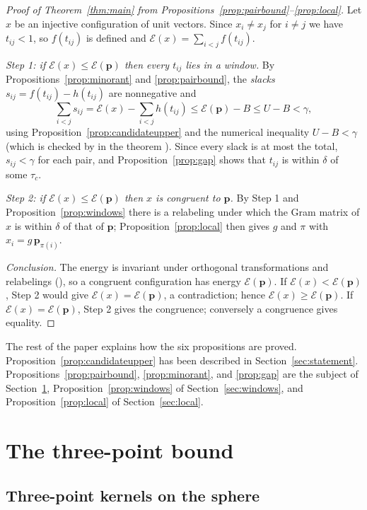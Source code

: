 \documentclass[11pt]{amsart}
\theoremstyle{definition}
\theoremstyle{remark}
\newcommand{\E}{\mathcal{E}}
\newcommand{\cand}{\mathbf{p}}
\begin{document}
\begin{proof}[Proof of Theorem~\ref{thm:main} from Propositions~\ref{prop:pairbound}--\ref{prop:local}]
Let $x$ be an injective configuration of unit vectors. Since $x_i\ne x_j$ for $i\ne j$ we have $t_{ij}<1$, so $f(t_{ij})$ is defined and $\E(x)=\sum_{i<j}f(t_{ij})$.

\emph{Step 1: if $\E(x)\le\E(\cand)$ then every $t_{ij}$ lies in a window.} By Propositions~\ref{prop:minorant} and \ref{prop:pairbound}, the \emph{slacks} $s_{ij}=f(t_{ij})-h(t_{ij})$ are nonnegative and
\[
  \sum_{i<j}s_{ij}=\E(x)-\sum_{i<j}h(t_{ij})\le \E(\cand)-B\le U-B<\gamma ,
\]
using Proposition~\ref{prop:candidateupper} and the numerical inequality $U-B<\gamma$ (which is checked by  in the theorem ). Since every slack is at most the total, $s_{ij}<\gamma$ for each pair, and Proposition~\ref{prop:gap} shows that $t_{ij}$ is within $\delta$ of some $\tau_c$.

\emph{Step 2: if $\E(x)\le\E(\cand)$ then $x$ is congruent to $\cand$.} By Step 1 and Proposition~\ref{prop:windows} there is a relabeling under which the Gram matrix of $x$ is within $\delta$ of that of $\cand$; Proposition~\ref{prop:local} then gives $g$ and $\pi$ with $x_i=g\,\cand_{\pi(i)}$.

\emph{Conclusion.} The energy is invariant under orthogonal transformations and relabelings (), so a congruent configuration has energy $\E(\cand)$. If $\E(x)<\E(\cand)$, Step 2 would give $\E(x)=\E(\cand)$, a contradiction; hence $\E(x)\ge\E(\cand)$. If $\E(x)=\E(\cand)$, Step 2 gives the congruence; conversely a congruence gives equality.
\end{proof}

The rest of the paper explains how the six propositions are proved. Proposition~\ref{prop:candidateupper} has been described in Section~\ref{sec:statement}. Propositions~\ref{prop:pairbound}, \ref{prop:minorant}, and \ref{prop:gap} are the subject of Section~\ref{sec:threepoint}, Proposition~\ref{prop:windows} of Section~\ref{sec:windows}, and Proposition~\ref{prop:local} of Section~\ref{sec:local}.

\section{The three-point bound}\label{sec:threepoint}

\subsection{Three-point kernels on the sphere}
\end{document}
